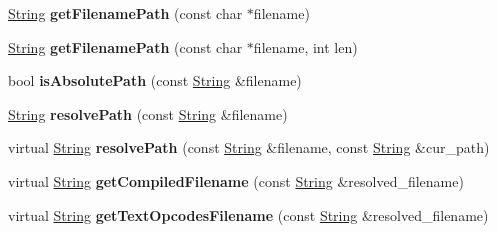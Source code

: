 \begin{DoxyCompactItemize}
\item 
\hyperlink{class_object_script_1_1_o_s_1_1_string}{String} {\bfseries get\+Filename\+Path} (const char $\ast$filename)\hypertarget{class_object_script_1_1_o_s_a4d819be0d70ba89811865b07b7314866}{}\label{class_object_script_1_1_o_s_a4d819be0d70ba89811865b07b7314866}

\item 
\hyperlink{class_object_script_1_1_o_s_1_1_string}{String} {\bfseries get\+Filename\+Path} (const char $\ast$filename, int len)\hypertarget{class_object_script_1_1_o_s_a2ed70f4cf1a7b59aa32c9e6e672e71a6}{}\label{class_object_script_1_1_o_s_a2ed70f4cf1a7b59aa32c9e6e672e71a6}

\item 
bool {\bfseries is\+Absolute\+Path} (const \hyperlink{class_object_script_1_1_o_s_1_1_string}{String} \&filename)\hypertarget{class_object_script_1_1_o_s_a212fe4673f09ff046b89ff12408e765d}{}\label{class_object_script_1_1_o_s_a212fe4673f09ff046b89ff12408e765d}

\item 
\hyperlink{class_object_script_1_1_o_s_1_1_string}{String} {\bfseries resolve\+Path} (const \hyperlink{class_object_script_1_1_o_s_1_1_string}{String} \&filename)\hypertarget{class_object_script_1_1_o_s_a857aa603cb64fe5cabc5f8c110e4a2f4}{}\label{class_object_script_1_1_o_s_a857aa603cb64fe5cabc5f8c110e4a2f4}

\item 
virtual \hyperlink{class_object_script_1_1_o_s_1_1_string}{String} {\bfseries resolve\+Path} (const \hyperlink{class_object_script_1_1_o_s_1_1_string}{String} \&filename, const \hyperlink{class_object_script_1_1_o_s_1_1_string}{String} \&cur\+\_\+path)\hypertarget{class_object_script_1_1_o_s_a4dc86d48a2e893a6833a6a8a6218adb0}{}\label{class_object_script_1_1_o_s_a4dc86d48a2e893a6833a6a8a6218adb0}

\item 
virtual \hyperlink{class_object_script_1_1_o_s_1_1_string}{String} {\bfseries get\+Compiled\+Filename} (const \hyperlink{class_object_script_1_1_o_s_1_1_string}{String} \&resolved\+\_\+filename)\hypertarget{class_object_script_1_1_o_s_ad25eaa83341a33a447f1cc9565f5ec6e}{}\label{class_object_script_1_1_o_s_ad25eaa83341a33a447f1cc9565f5ec6e}

\item 
virtual \hyperlink{class_object_script_1_1_o_s_1_1_string}{String} {\bfseries get\+Text\+Opcodes\+Filename} (const \hyperlink{class_object_script_1_1_o_s_1_1_string}{String} \&resolved\+\_\+filename)\hypertarget{class_object_script_1_1_o_s_afd8ace174b67b974d37ad5685ef8ddbe}{}\label{class_object_script_1_1_o_s_afd8ace174b67b974d37ad5685ef8ddbe}


\end{DoxyCompactItemize}

